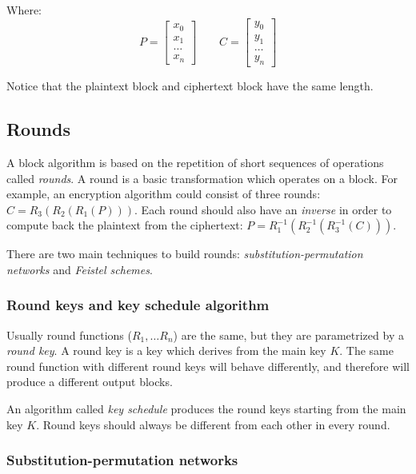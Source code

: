 \documentclass{article}
\begin{document}
  Where:
  $$
	P = 
	\begin{bmatrix}
	  x_{0} \\
	  x_{1} \\
	  \dots \\
	  x_{n}
	\end{bmatrix}
	\qquad
	C = 
	\begin{bmatrix}
	  y_{0} \\
	  y_{1} \\
	  \dots \\
	  y_{n}
	\end{bmatrix}
  $$

  Notice that the plaintext block and ciphertext block have the same
  length.

  \subsection{Rounds}

  A block algorithm is based on the repetition of short sequences of
  operations called \emph{rounds}.
  A round is a basic transformation which operates on a block. For
  example, an encryption algorithm could consist of three rounds: $C =
  R_{3} (R_{2}(R_{1}(P)))$. Each round should also have an
  \emph{inverse} in order to compute back the plaintext from the
  ciphertext: $P = R_{1}^{-1} (R_{2}^{-1}(R_{3}^{-1}(C)))$.
  
  There are two main techniques to build rounds:
  \emph{substitution-permutation networks} and \emph{Feistel
  schemes}.


  \subsubsection{Round keys and key schedule algorithm}

  Usually round functions ($R_{1},\dots R_{n}$) are the same, but they
  are parametrized by a \emph{round key}.
  A round key is a key which derives from the main key $K$.
  The same round function with different round keys will behave
  differently, and therefore will produce a different output blocks.

  An algorithm called \emph{key schedule} produces the round keys
  starting from the main key $K$.
  Round keys should always be different from each other in every round.
  

  \subsubsection{Substitution-permutation networks}  
\end{document}
